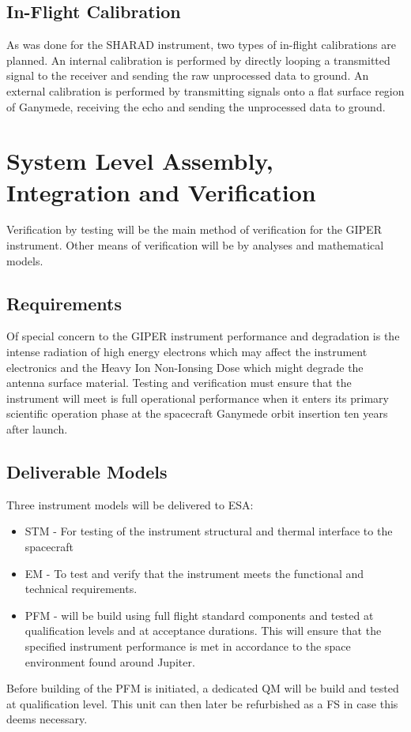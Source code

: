 \subsection{In-Flight Calibration}
As was done for the SHARAD instrument\cite{SHARAD_ppt}, two types of in-flight calibrations are planned. An internal calibration is performed by directly looping a transmitted signal to the receiver and sending the raw unprocessed data to ground. An external calibration is performed by transmitting signals onto a flat surface region of Ganymede, receiving the echo and sending the unprocessed data to ground.
%
%
\section{System Level Assembly, Integration and Verification}
%
Verification by testing will be the main method of verification for the \ac{GIPER} instrument. Other means of verification will be by analyses and mathematical models.  
%
\subsection{Requirements}
Of special concern to the \ac{GIPER} instrument performance and degradation is the intense radiation of high energy electrons which may affect the instrument electronics and the Heavy Ion Non-Ionsing Dose which might degrade the antenna surface material. Testing and verification must ensure that the instrument will meet is full operational performance when it enters its primary scientific operation phase at the spacecraft Ganymede orbit insertion ten years after launch.
%
\subsection{Deliverable Models}
%
Three instrument models will be delivered to ESA:
%
\begin{itemize}
\item \ac{STM} - For testing of the instrument structural and thermal interface to the spacecraft\\
\item \ac{EM} - To test and verify that the instrument meets the functional and technical requirements.\\
\item \ac{PFM} - will be build using full flight standard components and tested at qualification levels and at acceptance durations. This will ensure that the specified instrument performance is met in accordance to the space environment found around Jupiter.
\end{itemize}
%
Before building of the \ac{PFM} is initiated, a dedicated \ac{QM} will be build and tested at qualification level. This unit can then later be refurbished as a \ac{FS} in case this deems necessary.

